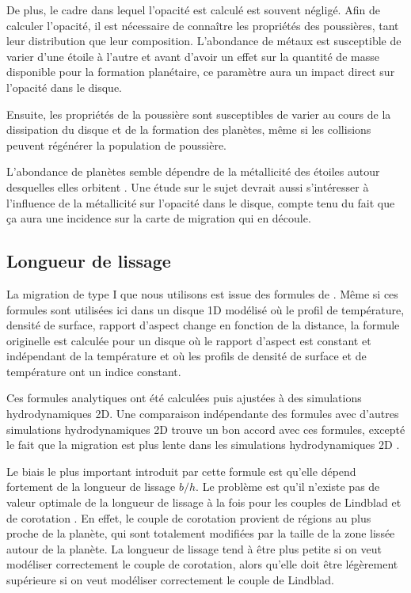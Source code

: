 De plus, le cadre dans lequel l'opacité est calculé est souvent négligé. Afin de calculer l'opacité, il est nécessaire de connaître les propriétés des poussières, tant leur distribution que leur composition. L'abondance de métaux est susceptible de varier d'une étoile à l'autre et avant d'avoir un effet sur la quantité de masse disponible pour la formation planétaire, ce paramètre aura un impact direct sur l'opacité dans le disque. 

Ensuite, les propriétés de la poussière sont susceptibles de varier au cours de la dissipation du disque et de la formation des planètes, même si les collisions peuvent régénérer la population de poussière.

L'abondance de planètes semble dépendre de la métallicité des étoiles autour desquelles elles orbitent \citep{fischer2005planet}. Une étude sur le sujet devrait aussi s'intéresser à l'influence de la métallicité sur l'opacité dans le disque, compte tenu du fait que ça aura une incidence sur la carte de migration qui en découle.

\subsection{Longueur de lissage}
La migration de type I que nous utilisons est issue des formules de \cite{paardekooper2011torque}. Même si ces formules sont utilisées ici dans un disque 1D modélisé où le profil de température, densité de surface, rapport d'aspect change en fonction de la distance, la formule originelle est calculée pour un disque où le rapport d'aspect est constant et indépendant de la température et où les profils de densité de surface et de température ont un indice constant. 

Ces formules analytiques ont été calculées puis ajustées à des simulations hydrodynamiques 2D. Une comparaison indépendante des formules avec d'autres simulations hydrodynamiques 2D trouve un bon accord avec ces formules, excepté le fait que la migration est plus lente dans les simulations hydrodynamiques 2D \citep{pierens2013makingaccepted}. 

Le biais le plus important introduit par cette formule est qu'elle dépend fortement de la longueur de lissage $b/h$. Le problème est qu'il n'existe pas de valeur optimale de la longueur de lissage à la fois pour les couples de Lindblad et de corotation \citep{masset2002coorbital}. En effet, le couple de corotation provient de régions au plus proche de la planète, qui sont totalement modifiées par la taille de la zone lissée autour de la planète. La longueur de lissage tend à être plus petite si on veut modéliser correctement le couple de corotation, alors qu'elle doit être légèrement supérieure si on veut modéliser correctement le couple de Lindblad. 


